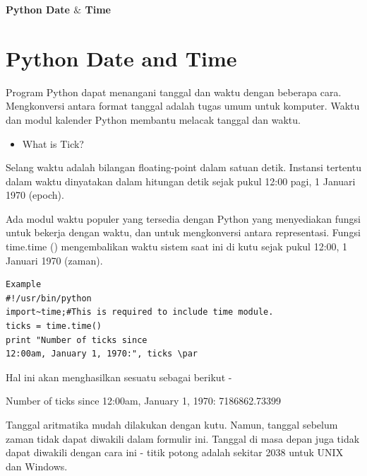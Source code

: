 
\sloppy
\begin{center}{\fontsize{16pt}{16pt}\selectfont \textbf{Python Date  $  \&  $ Time} \\}\end{center} \par

 \section{Python Date and Time}
\noindent 
 Program Python dapat menangani tanggal dan waktu dengan beberapa cara. Mengkonversi antara format tanggal adalah tugas umum untuk komputer. Waktu dan modul kalender Python membantu melacak tanggal dan waktu. \par

\noindent 
\begin{itemize}
	\item What is Tick?
\end{itemize}
\noindent 
Selang waktu adalah bilangan floating-point dalam satuan detik. Instansi tertentu dalam waktu dinyatakan dalam hitungan detik sejak pukul 12:00 pagi, 1 Januari 1970 (epoch). \par
\noindent 
Ada modul waktu populer yang tersedia dengan Python yang menyediakan fungsi untuk bekerja dengan waktu, dan untuk mengkonversi antara representasi. Fungsi time.time () mengembalikan waktu sistem saat ini di kutu sejak pukul 12:00, 1 Januari 1970 (zaman). \par
\vspace{12pt}
\vspace{\baselineskip}
\noindent 
\begin{verbatim}
Example 
#!/usr/bin/python
import~time;#This is required to include time module.
ticks = time.time() 
print "Number of ticks since 
12:00am, January 1, 1970:", ticks \par 
\end{verbatim}
\vspace{10pt}
Hal ini akan menghasilkan sesuatu sebagai berikut - \par
\noindent 
Number of ticks since 12:00am, January 1, 1970: 7186862.73399 \par
\vspace{\baselineskip}
\noindent 
Tanggal aritmatika mudah dilakukan dengan kutu. Namun, tanggal sebelum zaman tidak dapat diwakili dalam formulir ini. Tanggal di masa depan juga tidak dapat diwakili dengan cara ini - titik potong adalah sekitar 2038 untuk UNIX dan Windows. \par
